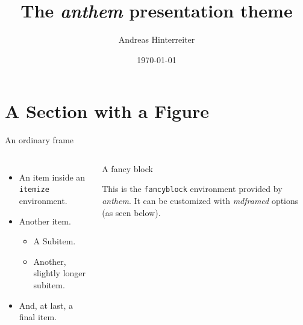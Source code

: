 \documentclass{beamer}
\title{The \emph{anthem} presentation theme}
\author{Andreas Hinterreiter}
\date{\today}
\begin{document}
\begin{frame}[plain]
	\titlepage
\end{frame}

\section{A Section with a Figure}

\begin{frame}[plain]
\sectionpage
\end{frame}

\begin{frame}{An ordinary frame}
\begin{columns}
	\begin{itemize}
		\item An item inside an \texttt{itemize} environment.
		\item Another item.
		\begin{itemize}
			\item A Subitem.
			\item Another, slightly longer subitem.
		\end{itemize}
		\item And, at last, a final item.
	\end{itemize}
	\begin{fancyblock}{A fancy block}
	\raggedright This is the \texttt{fancyblock} environment provided by \emph{anthem}.  It can be customized with \emph{mdframed} options (as seen below).
	\end{fancyblock}
\end{columns}
\end{frame}

\end{document}
